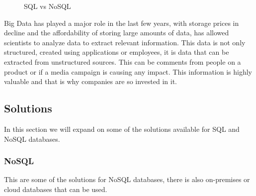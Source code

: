 \begin{itemize}
{\begin{center}
\begin{figure}[h!]
			\caption{SQL vs NoSQL}
			\label{nosql}
		\end{figure}
	\end{center}
	Big Data has played a major role in the last few years, with storage prices in decline and the affordability of storing large amounts of data, has allowed scientists to analyze data to extract relevant information. This data is not only structured, created using applications or employees, it is data that can be extracted from unstructured sources. This can be comments from people on a product or if a media campaign is causing any impact. This information is highly valuable and that is why companies are so invested in it.\cite{db-hist}
	}
\end{itemize}
\clearpage
\subsection{Solutions}\label{sec:chap3_db_sol}
In this section we will expand on some of the solutions available for SQL and NoSQL databases.

\subsubsection{NoSQL}\label{sec:chap3_db_nosql}
This are some of the solutions for NoSQL databases, there is also on-premises or cloud databases that can be used.

